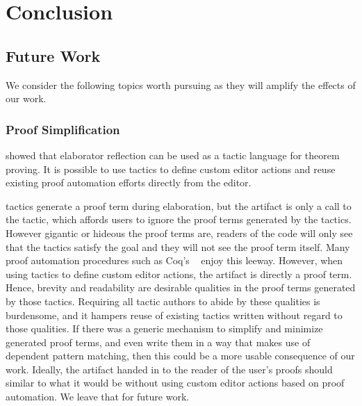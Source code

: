 \section{Conclusion}\label{sec:conclusion}

\subsection{Future Work}

We consider the following topics worth pursuing as they will amplify the effects
of our work.

\subsubsection{Proof Simplification}

\citet{elabref} showed that elaborator reflection can be used as a tactic
language for theorem proving. It is possible to use \Elab{} tactics to define
custom editor actions and reuse existing proof automation efforts directly from
the editor.

\Elab{} tactics generate a proof term during elaboration, but the artifact is
only a call to the tactic, which affords users to ignore the proof terms
generated by the tactics. However gigantic or hideous the proof terms are,
readers of the code will only see that the tactics satisfy the goal and they
will not see the proof term itself. Many proof automation procedures such as
Coq's ~\cite{omega} enjoy this leeway.
However, when using \Elab{} tactics to
define custom editor actions, the artifact is directly a proof term. Hence,
brevity and readability are desirable qualities in the proof terms generated by
those tactics.
Requiring all tactic authors to abide by these qualities is burdensome, and it
hampers reuse of existing tactics written without regard to those qualities.
If there was a generic mechanism to simplify and minimize
generated proof terms, and even write them in a way that makes use of dependent
pattern matching, then this could be a more usable consequence of our work.
Ideally, the artifact handed in to the reader of the user's proofs should
similar to what it would be without using custom editor actions based on proof
automation.  We leave that for future work.


